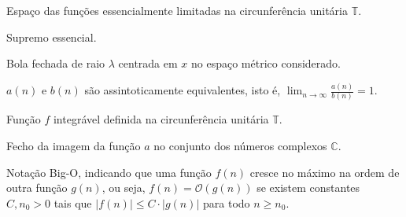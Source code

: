 \begin{description}[leftmargin=!, labelwidth=\widthof{\texttt{Função $f : X \to Y$}}]
  \item[$L^\infty(\mathbb{T})$] Espaço das funções essencialmente limitadas na circunferência unitária $\mathbb{T}$.

  \item[$\esssup$] Supremo essencial.

  \item[$\overline{B}_{\lambda}(x)$] Bola fechada de raio $\lambda$ centrada em $x$ no espaço métrico considerado.

  \item[$a(n) \sim b(n)$] $a(n)$ e $b(n)$ são assintoticamente equivalentes, isto é, $\lim_{n \to \infty} \frac{a(n)}{b(n)} = 1$.

  \item[$f \in L^1(\mathbb{T})$] Função $f$ integrável definida na circunferência unitária $\mathbb{T}$.

  \item[$\overline{a(\mathbb{T})}$] Fecho da imagem da função $a$ no conjunto dos números complexos $\mathbb{C}$.

  \item[$\mathcal{O}(\cdot)$] Notação Big-O, indicando que uma função $f(n)$ cresce no máximo na ordem de outra função $g(n)$, ou seja, $f(n) = \mathcal{O}(g(n))$ se existem constantes $C, n_0 > 0$ tais que $|f(n)| \leq C \cdot |g(n)|$ para todo $n \geq n_0$.
\end{description}

\newpage

